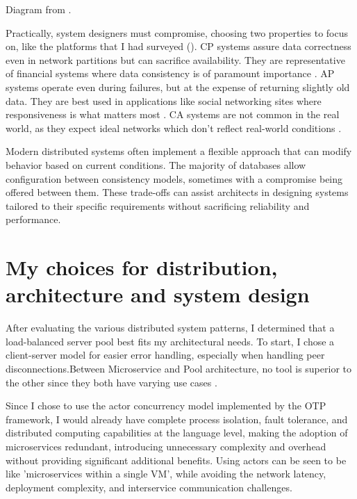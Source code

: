 \documentclass[]{final}
\begin{document}
Diagram from \cite{noauthor_cap_nodate}.

Practically, system designers must compromise, choosing two properties to focus
on, like the platforms that I had surveyed {\hypersetup{linkcolor=teal}(\pageref{survey})}.
CP systems assure data correctness even in network partitions but
can sacrifice availability. They are representative of financial systems
where data consistency is of paramount importance \cite{noauthor_cap_nodate}. AP systems operate even
during failures, but at the expense of returning slightly old data. They
are best used in applications like social networking sites where
responsiveness is what matters most \cite{noauthor_cap_nodate}. CA systems are not common in the
real world, as they expect ideal networks which don't reflect
real-world conditions \cite{noauthor_cap_nodate}.

Modern distributed systems often implement a flexible approach that can modify
behavior based on current conditions. The majority of databases allow
configuration between consistency models, sometimes with a compromise being
offered between them. These trade-offs can assist architects in designing
systems tailored to their specific requirements without sacrificing
reliability and performance.

\section{My choices for distribution, architecture and system design}

After evaluating the various distributed system patterns,
I determined that a load-balanced server pool best fits my architectural
needs. To start, I chose a client-server model for easier error handling,
especially when handling peer disconnections.Between Microservice and Pool
architecture, no tool is superior to the other
since they both have varying use cases \cite{cubet_microservice_nodate}.

Since I chose to use the actor concurrency model implemented by the OTP
framework, I would already have complete process isolation, fault tolerance,
and distributed computing capabilities at the language level, making
the adoption of microservices redundant, introducing unnecessary complexity
and overhead without providing significant additional benefits.
Using actors can be seen to be like 'microservices within a single VM', while
avoiding the network latency, deployment complexity, and interservice
communication challenges.
\end{document}
